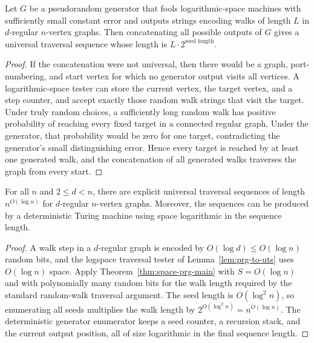 \begin{lemma}
  \label{lem:prg-to-uts}
  Let $G$ be a pseudorandom generator that fools logarithmic-space machines
  with sufficiently small constant error and outputs strings encoding walks of
  length $L$ in $d$-regular $n$-vertex graphs. Then concatenating all possible
  outputs of $G$ gives a universal traversal sequence whose length is
  $L\cdot 2^{\text{seed length}}$.
\end{lemma}
\begin{proof}
  If the concatenation were not universal, then there would be a graph,
  port-numbering, and start vertex for which no generator output visits all
  vertices. A logarithmic-space tester can store the current vertex, the target
  vertex, and a step counter, and accept exactly those random walk strings that
  visit the target. Under truly random choices, a sufficiently long random
  walk has positive probability of reaching every fixed target in a connected
  regular graph. Under the generator, that probability would be zero for one
  target, contradicting the generator's small distinguishing error. Hence every
  target is reached by at least one generated walk, and the concatenation of
  all generated walks traverses the graph from every start.
\end{proof}

\begin{theorem}
  \label{thm:universal-traversal}
  For all $n$ and $2\le d<n$, there are explicit universal traversal sequences
  of length $n^{O(\log n)}$ for $d$-regular $n$-vertex graphs. Moreover, the
  sequences can be produced by a deterministic Turing machine using space
  logarithmic in the sequence length.
\end{theorem}
\begin{proof}
  A walk step in a $d$-regular graph is encoded by $O(\log d)\le O(\log n)$
  random bits, and the logspace traversal tester of Lemma~\ref{lem:prg-to-uts}
  uses $O(\log n)$ space. Apply Theorem~\ref{thm:space-prg-main} with
  $S=O(\log n)$ and with polynomially many random bits for the walk length
  required by the standard random-walk traversal argument. The seed length is
  $O(\log^2 n)$, so enumerating all seeds multiplies the walk length by
  $2^{O(\log^2 n)}=n^{O(\log n)}$. The deterministic generator enumerator keeps
  a seed counter, a recursion stack, and the current output position, all of
  size logarithmic in the final sequence length.
\end{proof}

